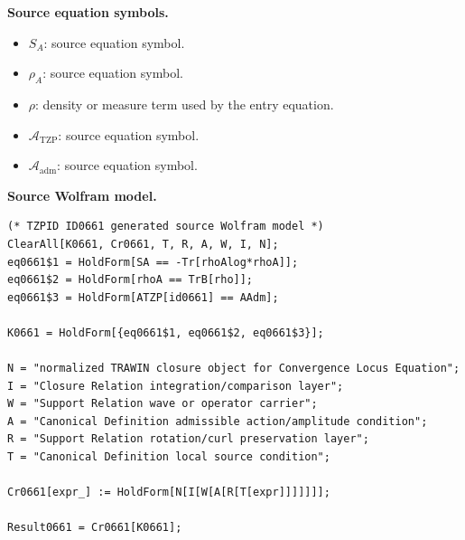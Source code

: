\begin{minipage}[t]{0.49\linewidth}
\begingroup
\small
\raggedright
\textbf{Source equation symbols.}\par
\begin{itemize}[leftmargin=1.35em,itemsep=1pt,topsep=1pt,parsep=0pt]
    \item $S_A$: source equation symbol.
    \item $\rho_A$: source equation symbol.
    \item $\rho$: density or measure term used by the entry equation.
    \item $\mathcal{A}_{\mathrm{TZP}}$: source equation symbol.
    \item $\mathcal{A}_{\mathrm{adm}}$: source equation symbol.
\end{itemize}
\endgroup
\end{minipage}\hfill
\begin{minipage}[t]{0.47\linewidth}
\begingroup
\scriptsize
\raggedright
\textbf{Source Wolfram model.}\par
\begin{Verbatim}[fontsize=\tiny,breaklines=true,breakanywhere=true]
(* TZPID ID0661 generated source Wolfram model *)
ClearAll[K0661, Cr0661, T, R, A, W, I, N];
eq0661$1 = HoldForm[SA == -Tr[rhoAlog*rhoA]];
eq0661$2 = HoldForm[rhoA == TrB[rho]];
eq0661$3 = HoldForm[ATZP[id0661] == AAdm];

K0661 = HoldForm[{eq0661$1, eq0661$2, eq0661$3}];

N = "normalized TRAWIN closure object for Convergence Locus Equation";
I = "Closure Relation integration/comparison layer";
W = "Support Relation wave or operator carrier";
A = "Canonical Definition admissible action/amplitude condition";
R = "Support Relation rotation/curl preservation layer";
T = "Canonical Definition local source condition";

Cr0661[expr_] := HoldForm[N[I[W[A[R[T[expr]]]]]]];

Result0661 = Cr0661[K0661];
\end{Verbatim}
\endgroup
\end{minipage}

